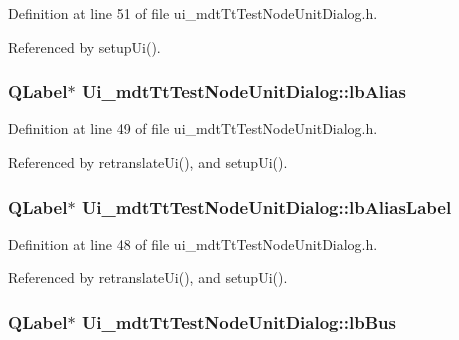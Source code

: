 Definition at line 51 of file ui\-\_\-mdt\-Tt\-Test\-Node\-Unit\-Dialog.\-h.



Referenced by setup\-Ui().

\hypertarget{class_ui__mdt_tt_test_node_unit_dialog_aee2e3ded4edb11000a66a07b23a1c672}{
\subsubsection[{lb\-Alias}]{\setlength{\rightskip}{0pt plus 5cm}Q\-Label$\ast$ Ui\-\_\-mdt\-Tt\-Test\-Node\-Unit\-Dialog\-::lb\-Alias}}\label{class_ui__mdt_tt_test_node_unit_dialog_aee2e3ded4edb11000a66a07b23a1c672}


Definition at line 49 of file ui\-\_\-mdt\-Tt\-Test\-Node\-Unit\-Dialog.\-h.



Referenced by retranslate\-Ui(), and setup\-Ui().

\hypertarget{class_ui__mdt_tt_test_node_unit_dialog_af4046ea35c18a8e70ea103ef57b4f96e}{
\subsubsection[{lb\-Alias\-Label}]{\setlength{\rightskip}{0pt plus 5cm}Q\-Label$\ast$ Ui\-\_\-mdt\-Tt\-Test\-Node\-Unit\-Dialog\-::lb\-Alias\-Label}}\label{class_ui__mdt_tt_test_node_unit_dialog_af4046ea35c18a8e70ea103ef57b4f96e}


Definition at line 48 of file ui\-\_\-mdt\-Tt\-Test\-Node\-Unit\-Dialog.\-h.



Referenced by retranslate\-Ui(), and setup\-Ui().

\hypertarget{class_ui__mdt_tt_test_node_unit_dialog_ad810ff38c45a5ce5bb1a7cfdc1e9f6ab}{
\subsubsection[{lb\-Bus}]{\setlength{\rightskip}{0pt plus 5cm}Q\-Label$\ast$ Ui\-\_\-mdt\-Tt\-Test\-Node\-Unit\-Dialog\-::lb\-Bus}}\label{class_ui__mdt_tt_test_node_unit_dialog_ad810ff38c45a5ce5bb1a7cfdc1e9f6ab}


